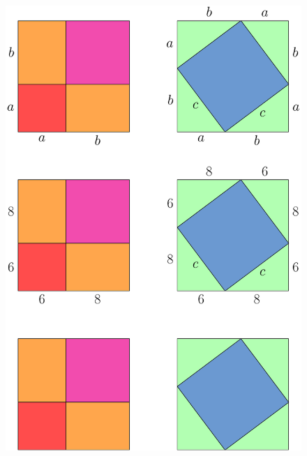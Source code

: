 \documentclass[english, 12 pt]{report}
\begin{document}
\newpage
\begin{figure}[hbt]
	\includegraphics[]{tri26d}
\end{figure}
\end{document}
